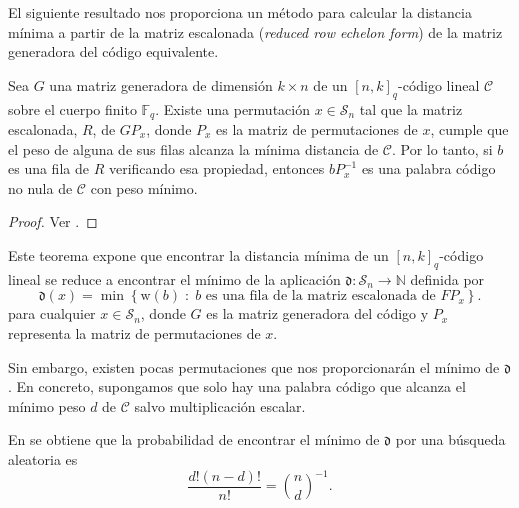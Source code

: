 El siguiente resultado nos proporciona un método para calcular la distancia mínima a partir de la matriz escalonada (\emph{reduced row echelon form}) de la matriz generadora del código equivalente.

\begin{theorem}
    Sea $G$ una matriz generadora de dimensión $k \times n$ de un $[n, k]_q$-código lineal $\mathcal{C}$ sobre el cuerpo finito $\mathbb{F}_q$. Existe una permutación $x \in \mathcal{S}_n$ tal que la matriz escalonada, $R$, de $GP_x$, donde $P_x$ es la matriz de permutaciones de $x$, cumple que el peso de alguna de sus filas alcanza la mínima distancia de $\mathcal{C}$. Por lo tanto, si $b$ es una fila de $R$ verificando esa propiedad, entonces $bP_x^{-1}$ es una palabra código no nula de $\mathcal{C}$ con peso mínimo.
\end{theorem}

\begin{proof}
    Ver \cite[Página 4]{Cuellar_etal}.
\end{proof}

Este teorema expone que encontrar la distancia mínima de un $[n, k]_q$-código lineal se reduce a encontrar el mínimo de la aplicación $\mathfrak d : \mathcal{S}_n \rightarrow \mathbb{N}$ definida por
\[
    \mathfrak d (x) = \min \left\{ \text{w}(b) \; : \; b \text{ es una fila de la matriz escalonada de } FP_x \right\}.
\]
para cualquier $x \in \mathcal{S}_n$, donde $G$ es la matriz generadora del código y $P_x$ representa la matriz de permutaciones de $x$.

Sin embargo, existen pocas permutaciones que nos proporcionarán el mínimo de $\mathfrak{d}$. En concreto, supongamos que solo hay una palabra código que alcanza el mínimo peso $d$ de $\mathcal{C}$ salvo multiplicación escalar.

En \cite{Cuellar_etal} se obtiene que la probabilidad de encontrar el mínimo de $\mathfrak{d}$ por una búsqueda aleatoria es
\[
    \frac{d! (n-d)!}{n!} = {n \choose d}^{-1}.
\]

